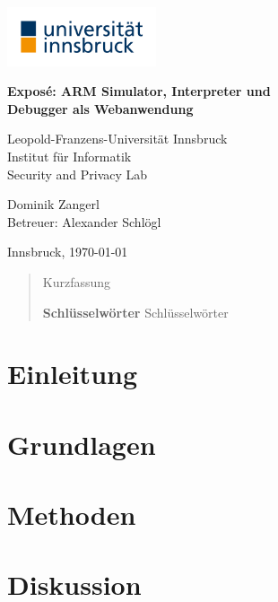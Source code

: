 \documentclass[a4paper, 11pt, onecolumn]{article}
\providecommand{\keywords}[1]
{
  \noindent \textbf{Schlüsselwörter } #1
}
\begin{document}
\renewcommand{\abstractname}{Kurzfassung}
    \begin{center}

        \includegraphics[width=0.33\textwidth]{data/uibk} 
        
		\LARGE
        \textbf{Exposé: ARM Simulator, Interpreter und\\Debugger als Webanwendung\\}
        
		\vspace{0.2cm}        
            
        \large
        Leopold-Franzens-Universität Innsbruck\\
        Institut für Informatik\\
		Security and Privacy Lab
		
		\vspace{0.4cm}   
		
		\Large  
        Dominik Zangerl\\
		Betreuer: Alexander Schlögl  
                
        \vspace{0.4cm}
        
        \large    
        Innsbruck, \today
           
    \end{center}
\begin{abstract}

Kurzfassung

\keywords{Schlüsselwörter}

\end{abstract}

\section{Einleitung}

\section{Grundlagen}

\section{Methoden}

\section{Diskussion}


\nocite{*}



\end{document}

